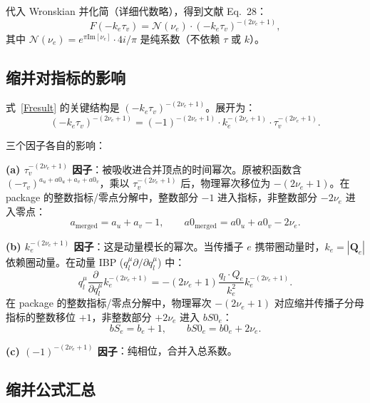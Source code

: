 ﻿\documentclass[a4paper,11pt]{article}
\begin{document}
代入 Wronskian 并化简（详细代数略），得到文献 Eq.~28：
\begin{equation}
  \boxed{F(-k_e\tau_v) = \mathcal{N}(\nu_e) \cdot (-k_e\tau_v)^{-(2\nu_e + 1)},}
  \label{Fresult}
\end{equation}
其中 $\mathcal{N}(\nu_e) = e^{\pi \text{Im}[\nu_e]} \cdot 4i/\pi$ 是纯系数（不依赖 $\tau$ 或 $k$）。

\subsection{缩并对指标的影响}

式~\eqref{Fresult} 的关键结构是 $(-k_e\tau_v)^{-(2\nu_e+1)}$。展开为：
\begin{equation}
  (-k_e\tau_v)^{-(2\nu_e+1)} = (-1)^{-(2\nu_e+1)} \cdot k_e^{-(2\nu_e+1)} \cdot \tau_v^{-(2\nu_e+1)}.
  \label{Fexpand}
\end{equation}

三个因子各自的影响：

\textbf{(a) $\tau_v^{-(2\nu_e+1)}$ 因子}：被吸收进合并顶点的时间幂次。原被积函数含 $(-\tau_v)^{a_u+a0_u+a_v+a0_v}$，乘以 $\tau_v^{-(2\nu_e+1)}$ 后，物理幂次移位为 $-(2\nu_e+1)$。在 package 的整数指标/零点分解中，整数部分 $-1$ 进入指标，非整数部分 $-2\nu_e$ 进入零点：
\begin{equation}
  \boxed{a_{\text{merged}} = a_u + a_v - 1,\qquad a0_{\text{merged}} = a0_u + a0_v - 2\nu_e.}
  \label{ashift}
\end{equation}

\textbf{(b) $k_e^{-(2\nu_e+1)}$ 因子}：这是动量模长的幂次。当传播子 $e$ 携带圈动量时，$k_e = |\boldsymbol{Q}_e|$ 依赖圈动量。在动量 IBP ($q_l^\mu \partial/\partial q_l^\mu$) 中：
\begin{equation}
  q_l^\mu \frac{\partial}{\partial q_l^\mu} k_e^{-(2\nu_e+1)} = -(2\nu_e+1) \frac{q_l \cdot Q_e}{k_e^2} k_e^{-(2\nu_e+1)}.
  \label{kshift}
\end{equation}
在 package 的整数指标/零点分解中，物理幂次 $-(2\nu_e+1)$ 对应缩并传播子分母指标的整数移位 $+1$，非整数部分 $+2\nu_e$ 进入 $bS0_e$：
\begin{equation}
  \boxed{bS_e = b_e + 1,\qquad bS0_e = b0_e + 2\nu_e.}
  \label{bSdef}
\end{equation}

\textbf{(c) $(-1)^{-(2\nu_e+1)}$ 因子}：纯相位，合并入总系数。

\subsection{缩并公式汇总}
\end{document}
